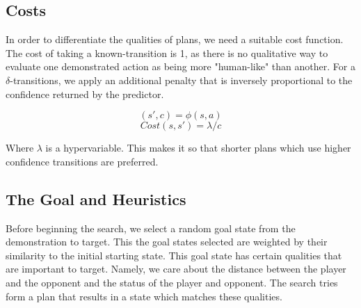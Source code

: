



\subsection{Costs}

In order to differentiate the qualities of plans, we need a suitable cost function. The cost of taking a known-transition is 1, as there is no qualitative way to evaluate one demonstrated action as being more "human-like" than another. For a $\delta$-transitions, we apply an additional penalty that is inversely proportional to the confidence returned by the predictor.

$$(s',c) = \phi(s, a)$$
$$Cost(s, s') = \lambda/c$$

Where $\lambda$ is a hypervariable. This makes it so that shorter plans which use higher confidence transitions are preferred. 

\subsection{The Goal and Heuristics}

Before beginning the search, we select a random goal state from the demonstration to target. This the goal states selected are weighted by their similarity to the initial starting state. This goal state has certain qualities that are important to target. Namely, we care about the distance between the player and the opponent and the status of the player and opponent. The search tries form a plan that results in a state which matches these qualities. 

